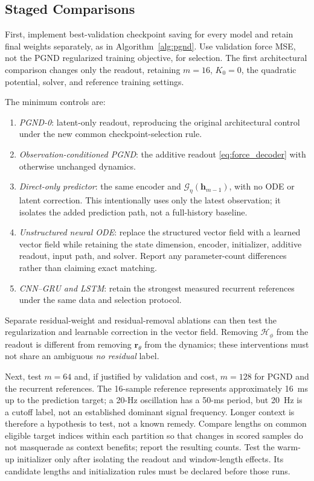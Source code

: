 \documentclass[journal,twoside]{IEEEtran}
\begin{document}
\subsection{Staged Comparisons}
First, implement best-validation checkpoint saving for every model and
retain final weights separately, as in Algorithm~\ref{alg:pgnd}. Use
validation force MSE, not the PGND regularized training objective, for
selection. The first architectural comparison changes only the readout,
retaining $m=16$, $K_0=0$, the quadratic potential, solver, and reference
training settings.

The minimum controls are:
\begin{enumerate}
    \item \emph{PGND-0}: latent-only readout, reproducing the original
    architectural control under the new common checkpoint-selection rule.
    \item \emph{Observation-conditioned PGND}: the additive readout
    \eqref{eq:force_decoder} with otherwise unchanged dynamics.
    \item \emph{Direct-only predictor}: the same encoder and
    $\mathcal G_\eta(\mathbf h_{m-1})$, with no ODE or latent correction.
    This intentionally uses only the latest observation; it isolates the
    added prediction path, not a full-history baseline.
    \item \emph{Unstructured neural ODE}: replace the structured vector
    field with a learned vector field while retaining the state dimension,
    encoder, initializer, additive readout, input path, and solver. Report
    any parameter-count differences rather than claiming exact matching.
    \item \emph{CNN--GRU and LSTM}: retain the strongest measured recurrent
    references under the same data and selection protocol.
\end{enumerate}
Separate residual-weight and residual-removal ablations can then test the
regularization and learnable correction in the vector field. Removing
$\mathcal H_\phi$ from the readout is different from removing
$\mathbf r_\theta$ from the dynamics; these interventions must not share
an ambiguous \emph{no residual} label.

Next, test $m=64$ and, if justified by validation and cost, $m=128$ for
PGND and the recurrent references. The 16-sample reference represents
approximately 16~ms up to the prediction target; a 20-Hz oscillation has
a 50-ms period, but 20~Hz is a cutoff label, not an established dominant
signal frequency. Longer context is therefore a hypothesis to test, not
a known remedy. Compare lengths on common eligible target indices within
each partition so that changes in scored samples do not masquerade as
context benefits; report the resulting counts. Test the warm-up
initializer only after isolating the readout and window-length effects.
Its candidate lengths and initialization rules must be declared before
those runs.
\end{document}
